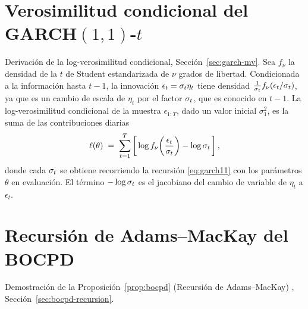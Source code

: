 \section{Verosimilitud condicional del GARCH$(1,1)$-$t$}
\label{anx:garch-mv}

Derivación de la log-verosimilitud condicional, Sección~\ref{sec:garch-mv}. Sea $f_\nu$ la densidad de la $t$ de Student estandarizada de $\nu$ grados de libertad. Condicionada a la información hasta $t-1$, la innovación $\epsilon_t = \sigma_t \eta_t$ tiene densidad $\tfrac{1}{\sigma_t} f_\nu(\epsilon_t/\sigma_t)$, ya que es un cambio de escala de $\eta_t$ por el factor $\sigma_t$, que es conocido en $t-1$. La log-verosimilitud condicional de la muestra $\epsilon_{1:T}$, dado un valor inicial $\sigma_1^2$, es la suma de las contribuciones diarias
\[
\ell(\theta) \;=\; \sum_{t=1}^{T} \left[\, \log f_\nu\!\left(\frac{\epsilon_t}{\sigma_t}\right) - \log \sigma_t \,\right],
\]
donde cada $\sigma_t$ se obtiene recorriendo la recursión \eqref{eq:garch11} con los parámetros $\theta$ en evaluación. El término $-\log\sigma_t$ es el jacobiano del cambio de variable de $\eta_t$ a $\epsilon_t$.

\section{Recursión de Adams--MacKay del BOCPD}
\label{anx:bocpd}

Demostración de la Proposición~\ref{prop:bocpd} (Recursión de Adams--MacKay) \cite{adams2007}, Sección~\ref{sec:bocpd-recursion}.

